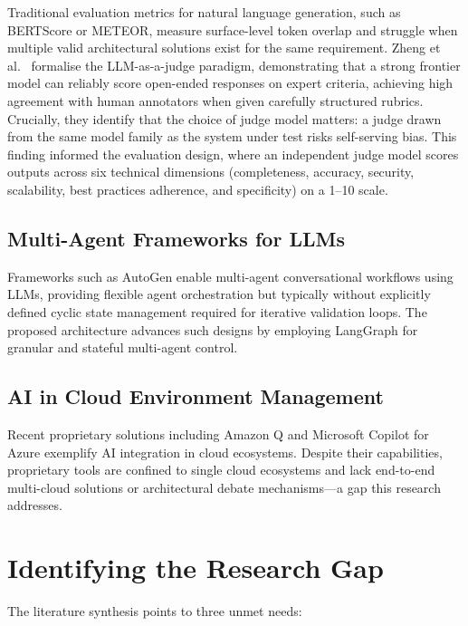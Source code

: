 Traditional evaluation metrics for natural language generation, such as BERTScore or METEOR, measure surface-level token overlap and struggle when multiple valid architectural solutions exist for the same requirement. 
Zheng et al.~\cite{zheng2024judging} formalise the LLM-as-a-judge paradigm, demonstrating that a strong frontier model can reliably score open-ended responses on expert criteria, achieving high agreement with human annotators when given carefully structured rubrics. Crucially, they identify that the choice of judge model matters: a judge drawn from the same model family as the system under test risks self-serving bias. This finding informed the evaluation design, where an independent judge model scores outputs across six technical dimensions (completeness, accuracy, security, scalability, best practices adherence, and specificity) on a 1--10 scale.

\subsection{Multi-Agent Frameworks for LLMs}

Frameworks such as AutoGen \cite{wu2023autogen} enable multi-agent conversational workflows using LLMs, providing flexible agent orchestration but typically without explicitly defined cyclic state management required for iterative validation loops. The proposed architecture advances such designs by employing LangGraph \cite{langgraph2024docs} for granular and stateful multi-agent control.

\subsection{AI in Cloud Environment Management}

Recent proprietary solutions including Amazon Q \cite{aws2023q} and Microsoft Copilot for Azure \cite{microsoft2024copilot} exemplify AI integration in cloud ecosystems. Despite their capabilities, proprietary tools are confined to single cloud ecosystems and lack end-to-end multi-cloud solutions or architectural debate mechanisms---a gap this research addresses.

\section{Identifying the Research Gap}

The literature synthesis points to three unmet needs:

